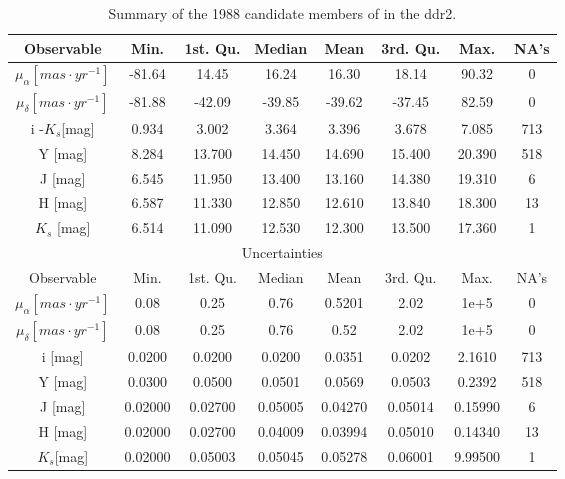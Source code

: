\begin{table}[ht!]
\caption{Summary of the 1988 candidate members of \citet{Bouy2015} in the \gls{ddr2}.}
\begin{center}
\begin{tabular}{|c|c|c|c|c|c|c|c|}
\hline
Observable & Min. & 1st. Qu. & Median & Mean & 3rd. Qu. & Max. & NA's \\
\hline
\hline
$\mu_{\alpha} [mas\cdot yr^{-1}]$&-81.64 &  14.45  & 16.24 &  16.30  & 18.14  & 90.32&0\\
$\mu_{\delta} [mas\cdot yr^{-1}]$&-81.88&  -42.09 & -39.85  & -39.62  &-37.45  & 82.59&0\\
i -$K_s$[mag] &  0.934 &   3.002 &  3.364  & 3.396 &  3.678 &  7.085  &   713\\
Y [mag]& 8.284 & 13.700 & 14.450  &14.690  &15.400 & 20.390  &   518\\
J [mag]& 6.545 & 11.950 & 13.400  &13.160 & 14.380  &19.310   &    6\\
H [mag]& 6.587 & 11.330 & 12.850  &12.610&  13.840 & 18.300   &   13\\
$K_s$ [mag]& 6.514 & 11.090 & 12.530 & 12.300 & 13.500 & 17.360   &    1\\
\hline
\multicolumn{8}{c}{Uncertainties}\\
\hline
Observable & Min. & 1st. Qu. & Median &Mean& 3rd. Qu. & Max. & NA's \\
\hline
\hline
$\mu_{\alpha} [mas\cdot yr^{-1}]$&0.08&0.25&0.76&0.5201&2.02&1e+5 &0\\ 
$\mu_{\delta} [mas\cdot yr^{-1}]$&0.08&0.25&0.76&0.52&2.02&1e+5& 0\\ 
i [mag] & 0.0200 & 0.0200 & 0.0200 & 0.0351 & 0.0202 & 2.1610&713 \\
Y [mag] & 0.0300&  0.0500&  0.0501&  0.0569&  0.0503 & 0.2392&518\\
J [mag] & 0.02000& 0.02700& 0.05005 &0.04270& 0.05014 &0.15990&6\\
H [mag] & 0.02000 &0.02700& 0.04009 &0.03994 &0.05010 & 0.14340&13\\
$K_s$[mag]&0.02000& 0.05003& 0.05045& 0.05278 &0.06001 &9.99500&1\\
\hline
\end{tabular}
\end{center}
\label{tab:rddr2_cluster}
\end{table}%

